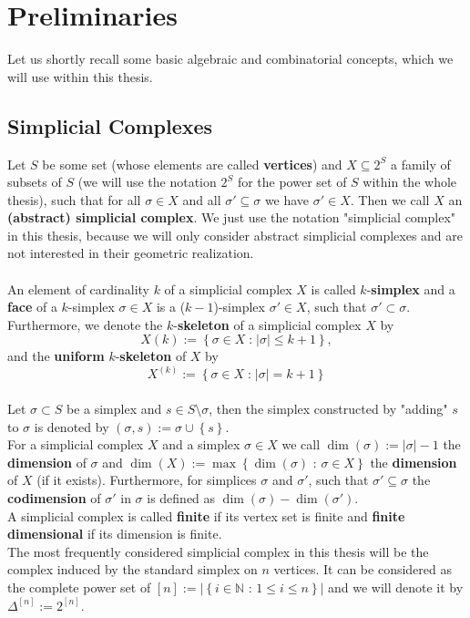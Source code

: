 
\manualmark
{}

\chapter*{Preliminaries}

\label{Preliminaries}

Let us shortly recall some basic algebraic and combinatorial concepts, which we will use within this thesis.

\section*{Simplicial Complexes}

Let \(S\) be some set (whose elements are called \textbf{vertices}) and \(X\subseteq 2^S\) a family of subsets of \(S\) (we will use the notation \(2^S\) for the power set of \(S\) within the whole thesis), such that for all \(\sigma\in X\) and all \(\sigma'\subseteq\sigma\) we have \(\sigma'\in X\). Then we call \(X\) an \textbf{(abstract) simplicial complex}. We just use the notation "simplicial complex" in this thesis, because we will only consider abstract simplicial complexes and are not interested in their geometric realization.\\
\\
An element of cardinality \(k\) of a simplicial complex \(X\) is called \(k\)-\textbf{simplex} and a \textbf{face} of a \(k\)-simplex \(\sigma\in X\) is a (\(k-1\))-simplex \(\sigma'\in X\), such that \(\sigma'\subset\sigma\). Furthermore, we denote the \(k\)-\textbf{skeleton} of a simplicial complex \(X\) by
\[
X(k):=\left\{\sigma\in X\;\text{:}\;\left|\sigma\right|\leq k+1\right\},
\]
and the \textbf{uniform} \(k\)-\textbf{skeleton} of \(X\) by
\[
X^{(k)}:=\left\{\sigma\in X\;\text{:}\;\left|\sigma\right|=k+1\right\}
\]
\\
Let \(\sigma\subset S\) be a simplex and \(s\in S\setminus\sigma\), then the simplex constructed by "adding" \(s\) to \(\sigma\) is denoted by \((\sigma,s):=\sigma\cup\left\{s\right\}\).\\
For a simplicial complex \(X\) and a simplex \(\sigma\in X\) we call \(\dim(\sigma):=|\sigma|-1\) the \textbf{dimension} of \(\sigma\) and \(\dim(X):=\max\left\{\dim(\sigma)\text{ : }\sigma\in X\right\}\) the \textbf{dimension} of \(X\) (if it exists). Furthermore, for simplices \(\sigma\) and \(\sigma'\), such that \(\sigma'\subseteq\sigma\) the \textbf{codimension} of \(\sigma'\) in \(\sigma\) is defined as \(\dim(\sigma)-\dim(\sigma')\). 
\\
A simplicial complex is called \textbf{finite} if its vertex set is finite and \textbf{finite dimensional} if its dimension is finite.\\
The most frequently considered simplicial complex in this thesis will be the complex induced by the standard simplex on \(n\) vertices. It can be considered as the complete power set of \([n]:=\left|\left\{i\in\mathbb{N}\text{ : }1\leq i\leq n\right\}\right|\) and we will denote it by \(\Delta^{[n]}:=2^{[n]}\).


